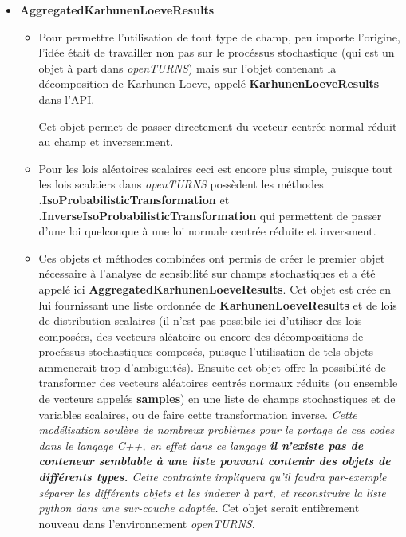 \documentclass[a4paper,10pt]{article}
\begin{document}
\begin{itemize}

  \item \textbf{AggregatedKarhunenLoeveResults} 
  \begin{itemize}
    \item Pour permettre l'utilisation de tout type de champ, peu importe l'origine, l'idée était de travailler non pas sur le procéssus stochastique (qui est un objet à part dans \textit{openTURNS}) mais sur l'objet contenant la décomposition de Karhunen Loeve, appelé \textbf{KarhunenLoeveResults} dans l'API. 
  
  Cet objet permet de passer directement du vecteur centrée normal réduit au champ et inversemment. 
    \item Pour les lois aléatoires scalaires ceci est encore plus simple, puisque tout les lois scalaiers dans \textit{openTURNS} possèdent les méthodes \textbf{.IsoProbabilisticTransformation} et \textbf{.InverseIsoProbabilisticTransformation} qui permettent de passer d'une loi quelconque à une loi normale centrée réduite et inversment.
  
    \item Ces objets et méthodes combinées ont permis de créer le premier objet nécessaire à l'analyse de sensibilité sur champs stochastiques et a été appelé ici \textbf{AggregatedKarhunenLoeveResults}. Cet objet est crée en lui fournissant une liste ordonnée de \textbf{KarhunenLoeveResults} et de lois de distribution scalaires (il n'est pas possibile ici d'utiliser des lois composées, des vecteurs aléatoire ou encore des décompositions de procéssus stochastiques composés, puisque l'utilisation de tels objets ammenerait trop d'ambiguités). Ensuite cet objet offre la possibilité de transformer des vecteurs aléatoires centrés normaux réduits (ou ensemble de vecteurs appelés \textbf{samples}) en une liste de champs stochastiques et de variables scalaires, ou de faire cette transformation inverse. \emph{Cette modélisation soulève de nombreux problèmes pour le portage de ces codes dans le langage C++, en effet dans ce langage \textbf{il n'existe pas de conteneur semblable à une liste pouvant contenir des objets de différents types.} Cette contrainte impliquera qu'il faudra par-exemple séparer les différents objets et les indexer à part, et reconstruire la liste python dans une sur-couche adaptée.} 
  Cet objet serait entièrement nouveau dans l'environnement \textit{openTURNS}.
  \end{itemize}
  

\end{itemize}
\end{document}
